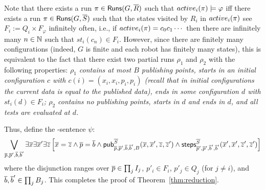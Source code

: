      
  Note that there exists a run $\pi \in \mathsf{Runs}(G,\overline{R})$ such that $active_i(\pi) \models \varphi$ iff there exists a run $\pi \in \mathsf{Runs}(G,\overline{S})$ such that the states visited by $R_i$ in $active_i(\pi)$ see $F_i := Q_i \times F_\varphi$ infinitely often,
  i.e., if $active_i(\pi) = c_0 c_1 \cdots$ then there are infinitely many $n \in \mathbb{N}$ such that $st_i(c_n) \in F_i$. However, since there are finitely many configurations (indeed, $G$ is finite and each robot has finitely many states), this is equivalent to the fact that there exist two partial runs $\rho_1$
  and $\rho_2$ with the following properties:
  \it
  \- $\rho_1$ contains at most $B$ publishing points, starts in an initial configuration $c$ with $c(i) = (x_i,x_i,p_i,p_i)$ (recall that in initial configurations the current data is equal to the published data), ends in some configuration $d$ with 
  $st_i(d) \in F_i$;
  \- $\rho_2$ contains no publishing points, starts in $d$ and ends in $d$, and all tests are evaluated at $d$.
  \ti 
 
 Thus, define the \msol-sentence $\psi$: 
 \[
\bigvee_{\overline{p},\overline{p}',\overline{b},\overline{b}'} \exists \overline{x} \exists \overline{x}' \exists \overline{z}  
\left[\overline{x} = \overline{z} \wedge \overline{p} = \overline{b} \wedge
\mathsf{pub}^{\overline{S}}_{\overline{p},\overline{p}',\overline{b},\overline{b}',B}(\overline{x},\overline{x}',\overline{z},\overline{z}') \wedge 
\mathsf{steps}^{\overline{S}}_{\overline{p}',\overline{p}',\overline{b}',\overline{b}'}(\overline{x}',\overline{x}',\overline{z}',\overline{z}')
\right]
 \]
where the disjunction ranges over $\overline{p} \in \prod_j I_j$, $p'_i \in F_i$, $p'_j \in Q_j$ (for $j \neq i$), and $\overline{b},\overline{b}' \in \prod_j B_j$.
This completes the proof of Theorem~\ref{thm:reduction}.

